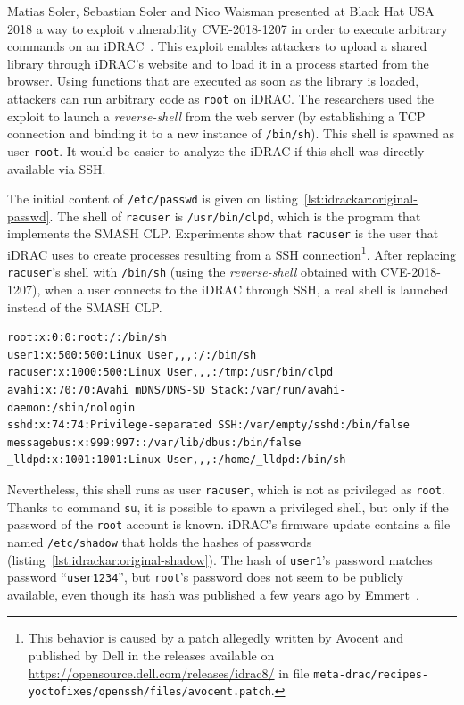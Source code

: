 Matias Soler, Sebastian Soler and Nico Waisman presented at Black Hat USA 2018 a way to exploit vulnerability CVE-2018-1207 in order to execute arbitrary commands on an iDRAC~\cite{idrackar:bhus2018bmc}.
This exploit enables attackers to upload a shared library through iDRAC's website and to load it in a process started from the browser.
Using functions that are executed as soon as the library is loaded, attackers can run arbitrary code as \texttt{root} on iDRAC.
The researchers used the exploit to launch a \emph{reverse-shell} from the web server (by establishing a TCP connection and binding it to a new instance of \texttt{/bin/sh}).
This shell is spawned as user \texttt{root}.
It would be easier to analyze the iDRAC if this shell was directly available via SSH.

The initial content of \texttt{/etc/passwd} is given on listing~\ref{lst:idrackar:original-passwd}.
The shell of \texttt{racuser} is \texttt{/usr/bin/clpd}, which is the program that implements the SMASH CLP.
Experiments show that \texttt{racuser} is the user that iDRAC uses to create processes resulting from a SSH connection\footnote{This behavior is caused by a patch allegedly written by Avocent and published by Dell in the releases available on \url{https://opensource.dell.com/releases/idrac8/} in file \texttt{meta-drac/recipes-yoctofixes/openssh/files/avocent.patch}.}.
After replacing \texttt{racuser}'s shell with \texttt{/bin/sh} (using the \emph{reverse-shell} obtained with CVE-2018-1207), when a user connects to the iDRAC through SSH, a real shell is launched instead of the SMASH CLP.

\begin{lstlisting}[language={},caption={original \texttt{/etc/passwd} from iDRAC firmware.},label={lst:idrackar:original-passwd}]
root:x:0:0:root:/:/bin/sh
user1:x:500:500:Linux User,,,:/:/bin/sh
racuser:x:1000:500:Linux User,,,:/tmp:/usr/bin/clpd
avahi:x:70:70:Avahi mDNS/DNS-SD Stack:/var/run/avahi-daemon:/sbin/nologin
sshd:x:74:74:Privilege-separated SSH:/var/empty/sshd:/bin/false
messagebus:x:999:997::/var/lib/dbus:/bin/false
_lldpd:x:1001:1001:Linux User,,,:/home/_lldpd:/bin/sh
\end{lstlisting}

Nevertheless, this shell runs as user \texttt{racuser}, which is not as privileged as \texttt{root}.
Thanks to command \texttt{su}, it is possible to spawn a privileged shell, but only if the password of the \texttt{root} account is known.
iDRAC's firmware update contains a file named \texttt{/etc/shadow} that holds the hashes of passwords (listing~\ref{lst:idrackar:original-shadow}).
The hash of \texttt{user1}'s password matches password ``\texttt{user1234}'', but \texttt{root}'s password does not seem to be publicly available, even though its hash was published a few years ago by Emmert~\cite{idrackar:emmert2015idrac}.

